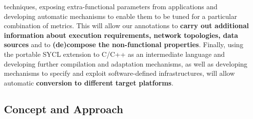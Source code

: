 \documentclass[a4paper,11pt]{article}
\begin{document}
techniques, exposing extra-functional parameters from applications and developing automatic mechanisms to
enable them to be tuned for a particular combination of metrics. This will allow our annotations to \textbf{carry
out additional information about execution requirements, network topologies, data sources} and to 
\textbf{(de)compose the non-functional properties}. Finally, using the portable SYCL extension to C/C++ as 
an intermediate language and developing further compilation and adaptation mechanisms, as well as developing
mechanisms to specify and exploit software-defined infrastructures, will allow automatic \textbf{conversion 
to different target platforms}.


{}
\subsection{Concept and Approach}


\end{document}
